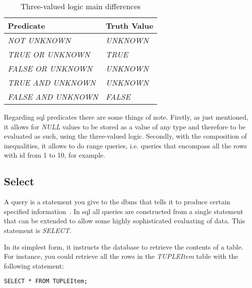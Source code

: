 \renewcommand\arraystretch{2.0}
\begin{table}[h!]
\centering
  \begin{tabular}{  m{6cm}  m{4cm} }
	\toprule
	\textbf{Predicate} & \textbf{Truth Value}\\
    \midrule
    \emph{NOT UNKNOWN} & \emph{UNKNOWN}\\
    \emph{TRUE OR UNKNOWN} & \emph{TRUE}\\
    \emph{FALSE OR UNKNOWN} & \emph{UNKNOWN}\\
    \emph{TRUE AND UNKNOWN} & \emph{UNKNOWN}\\
    \emph{FALSE AND UNKNOWN} & \emph{FALSE}\\
    \bottomrule
  \end{tabular}

\caption{Three-valued logic main differences}
\label{tab:logic_diff}
\end{table}

Regarding \ac{sql} predicates there are some things of note. Firstly, as just mentioned, it allows for \emph{NULL} values to be stored as a value of any type and therefore to be evaluated as such, using the three-valued logic. Secondly, with the composition of inequalities, it allows to do range queries, i.e. queries that encompass all the rows with id from 1 to 10, for example.

\subsection{Select}
A query is a statement you give to the \ac{dbms} that tells it to produce certain specified information~\cite{Gruber:2000:MS:518858}. In \ac{sql} all queries are constructed from a single statement that can be extended to allow some highly sophisticated evaluating of data. This statement is \emph{SELECT}.

In its simplest form, it instructs the database to retrieve the contents of a table. For instance, you could retrieve all the rows in the \emph{TUPLEItem} table with the following statement:

\lstset{
  language=SQL, 
  caption=SQL select statement, 
  label=lst:select_item,
}


\begin{shaded}
\begin{lstlisting}
SELECT * FROM TUPLEItem;
\end{lstlisting}  
\end{shaded}  

